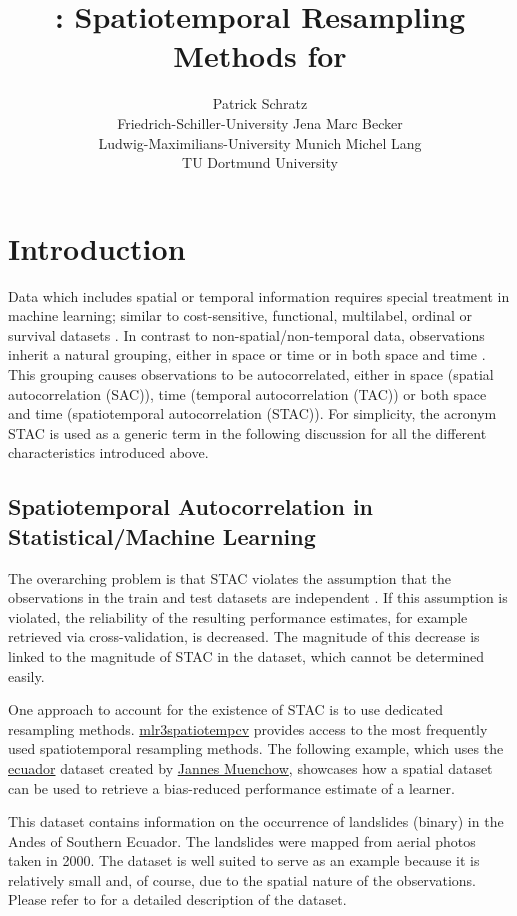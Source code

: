 \documentclass[
]{jss}
\author{
Patrick Schratz\\Friedrich-Schiller-University Jena \AND Marc
Becker\\Ludwig-Maximilians-University Munich \And Michel Lang\\TU
Dortmund University
}
\title{\pkg{mlr3spatiotempcv}: Spatiotemporal Resampling Methods for
\pkg{mlr3}}
\begin{document}
\hypertarget{introduction}{%
\section{Introduction}\label{introduction}}

Data which includes spatial or temporal information requires special
treatment in machine learning; similar to cost-sensitive, functional,
multilabel, ordinal or survival datasets \citep{mlr3book}. In contrast
to non-spatial/non-temporal data, observations inherit a natural
grouping, either in space or time or in both space and time
\citep{legendre1993}. This grouping causes observations to be
autocorrelated, either in space (spatial autocorrelation (SAC)), time
(temporal autocorrelation (TAC)) or both space and time (spatiotemporal
autocorrelation (STAC)). For simplicity, the acronym STAC is used as a
generic term in the following discussion for all the different
characteristics introduced above.

\hypertarget{spatiotemporal-autocorrelation-in-statisticalmachine-learning}{%
\subsection{Spatiotemporal Autocorrelation in Statistical/Machine
Learning}\label{spatiotemporal-autocorrelation-in-statisticalmachine-learning}}

The overarching problem is that STAC violates the assumption that the
observations in the train and test datasets are independent
\citep{hastie2001}. If this assumption is violated, the reliability of
the resulting performance estimates, for example retrieved via
cross-validation, is decreased. The magnitude of this decrease is linked
to the magnitude of STAC in the dataset, which cannot be determined
easily.

One approach to account for the existence of STAC is to use dedicated
resampling methods.
\href{https://mlr3spatiotempcv.mlr-org.com}{mlr3spatiotempcv} provides
access to the most frequently used spatiotemporal resampling methods.
The following example, which uses the
\href{https://mlr3spatiotempcv.mlr-org.com/reference/mlr_tasks_ecuador.html}{ecuador}
dataset created by
\href{https://scholar.google.com/citations?user=Slq94Y4AAAAJ\&hl=de\&authuser=1\&oi=ao}{Jannes
Muenchow}, showcases how a spatial dataset can be used to retrieve a
bias-reduced performance estimate of a learner.

This dataset contains information on the occurrence of landslides
(binary) in the Andes of Southern Ecuador. The landslides were mapped
from aerial photos taken in 2000. The dataset is well suited to serve as
an example because it is relatively small and, of course, due to the
spatial nature of the observations. Please refer to \citet{muenchow2012}
for a detailed description of the dataset.
\end{document}

